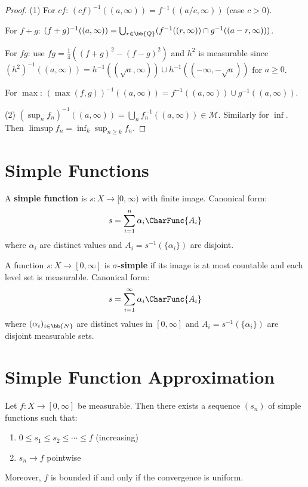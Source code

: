 \begin{proof}
(1) For $cf$: $(cf)^{-1}((a, \infty)) = f^{-1}((a/c, \infty))$ (case $c > 0$).

For $f + g$: $(f+g)^{-1}((a, \infty)) = \bigcup_{r \in \bb{Q}} (f^{-1}((r, \infty)) \cap g^{-1}((a-r, \infty)))$.

For $fg$: use $fg = \frac{1}{4}((f+g)^2 - (f-g)^2)$ and $h^2$ is measurable since $(h^2)^{-1}((a, \infty)) = h^{-1}((\sqrt{a}, \infty)) \cup h^{-1}((-\infty, -\sqrt{a}))$ for $a \geq 0$.

For $\max$: $(\max(f,g))^{-1}((a, \infty)) = f^{-1}((a, \infty)) \cup g^{-1}((a, \infty))$.

(2) $(\sup_n f_n)^{-1}((a, \infty)) = \bigcup_n f_n^{-1}((a, \infty)) \in \mathcal{M}$. Similarly for $\inf$. Then $\limsup f_n = \inf_k \sup_{n \geq k} f_n$.
\end{proof}

\section{Simple Functions}

\begin{definition}
A \textbf{simple function} is $s: X \to [0, \infty)$ with finite image. Canonical form:
\[ s = \sum_{i=1}^n \alpha_i \CharFunc{A_i} \]
where $\alpha_i$ are distinct values and $A_i = s^{-1}(\{\alpha_i\})$ are disjoint.
\end{definition}

\begin{definition}
A function $s: X \to [0, \infty]$ is \textbf{$\sigma$-simple} if its image is at most countable and each level set is measurable. Canonical form:
\[ s = \sum_{i=1}^\infty \alpha_i \CharFunc{A_i} \]
where $(\alpha_i)_{i \in \bb{N}}$ are distinct values in $[0, \infty]$ and $A_i = s^{-1}(\{\alpha_i\})$ are disjoint measurable sets.
\end{definition}

\section{Simple Function Approximation}

\begin{theorem}
Let $f: X \to [0, \infty]$ be measurable. Then there exists a sequence $(s_n)$ of simple functions such that:
\begin{enumerate}
    \item $0 \leq s_1 \leq s_2 \leq \cdots \leq f$ (increasing)
    \item $s_n \to f$ pointwise
\end{enumerate}
Moreover, $f$ is bounded if and only if the convergence is uniform.
\end{theorem}

